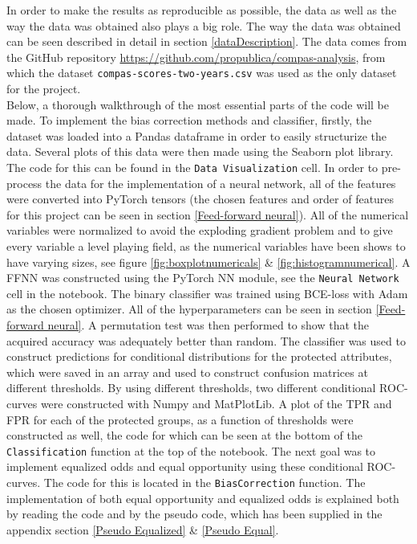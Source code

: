 \documentclass[11pt, fleqn, titlepage]{article}
\begin{document}
	In order to make the results as reproducible as possible, the data as well as the way the data was obtained also plays a big role. The way the data was obtained can be seen described in detail in section \ref{dataDescription}. The data comes from the GitHub repository \url{https://github.com/propublica/compas-analysis}, from which the dataset \texttt{compas-scores-two-years.csv} was used as the only dataset for the project. \\

	\noindent Below, a thorough walkthrough of the most essential parts of the code will be made. To implement the bias correction methods and classifier, firstly, the dataset was loaded into a Pandas dataframe in order to easily structurize the data. Several plots of this data were then made using the Seaborn plot library. The code for this can be found in the \texttt{Data Visualization} cell. In order to pre-process the data for the implementation of a neural network, all of the features were converted into PyTorch tensors (the chosen features and order of features for this project can be seen in section \ref{Feed-forward neural}). All of the numerical variables were normalized to avoid the exploding gradient problem and to give every variable a level playing field, as the numerical variables have been shows to have varying sizes, see figure \ref{fig:boxplotnumericals} \& \ref{fig:histogramnumerical}. A FFNN was constructed using the PyTorch NN module, see the \texttt{Neural Network} cell in the notebook. The binary classifier was trained using BCE-loss with Adam as the chosen optimizer. All of the hyperparameters can be seen in section \ref{Feed-forward neural}. A permutation test was then performed to show that the acquired accuracy was adequately better than random. The classifier was used to construct predictions for conditional distributions for the protected attributes, which were saved in an array and used to construct confusion matrices at different thresholds. By using different thresholds, two  different conditional ROC-curves were constructed with Numpy and MatPlotLib. A plot of the TPR and FPR for each of the protected groups, as a function of thresholds were constructed as well, the code for which can be seen at the bottom of the \texttt{Classification} function at the top of the notebook. The next goal was to implement equalized odds and equal opportunity using these conditional ROC-curves. The code for this is located in the \texttt{BiasCorrection} function. The implementation of both equal opportunity and equalized odds is explained both by reading the code and by the pseudo code, which has been supplied in the appendix section \ref{Pseudo Equalized} \& \ref{Pseudo Equal}.
	
\end{document}
